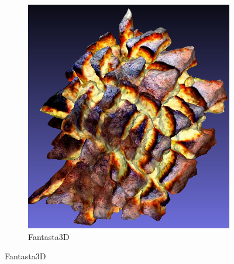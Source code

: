 \begin{figure}[ht]
\begin{subfigure}[b]{0.2\textwidth}
        \centering
        \includegraphics[width=\textwidth]{figures/subjective/fantasia_bread_result.png}
        \caption{Fantasta3D}
        \vspace{0.1cm}
    \end{subfigure}


\end{figure}
